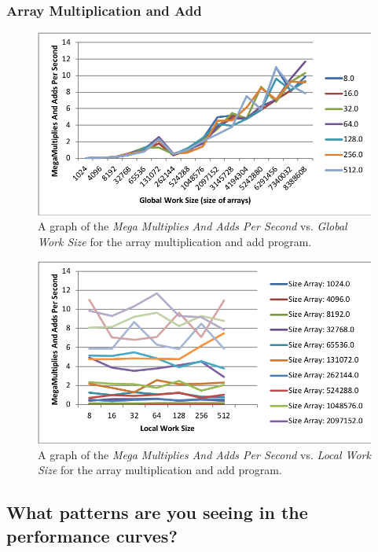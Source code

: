 \documentclass[onecolumn,draftclsnofoot, 10pt, compsoc]{IEEEtran}
\begin{document}
		\subsubsection{Array Multiplication and Add}
			\begin{figure}[H]
				\includegraphics[width=16cm]{multAddMegasVsGlobal}
				\centering
				\caption{A graph of the \textit{Mega Multiplies And Adds Per Second} vs. \textit{Global Work Size} for the array multiplication and add program.}
			\end{figure}
			
			\begin{figure}[H]
				\includegraphics[width=16cm]{multAddMegasVsLocal}
				\centering
				\caption{A graph of the \textit{Mega Multiplies And Adds Per Second} vs. \textit{Local Work Size} for the array multiplication and add program.}
			\end{figure}

			
	









	\subsection{What patterns are you seeing in the performance curves?}
\end{document}
